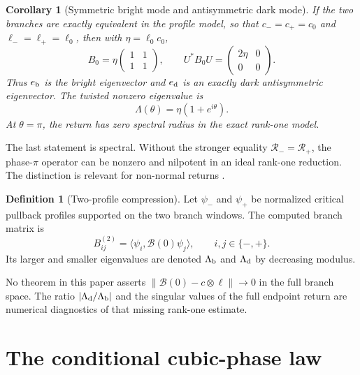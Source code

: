 \documentclass[11pt]{article}
\newtheorem{corollary}[theorem]{Corollary}
\theoremstyle{definition}
\newtheorem{definition}[theorem]{Definition}
\theoremstyle{remark}
\newcommand{\cR}{\mathcal R}
\newcommand{\cB}{\mathcal B}
\begin{document}
\begin{corollary}[Symmetric bright mode and antisymmetric dark mode]
\label{cor:bright-dark}
If the two branches are exactly equivalent in the profile model, so that
$c_-=c_+=c_0$ and $\ell_-=\ell_+=\ell_0$, then with
$\eta=\ell_0c_0$,
\begin{equation}\label{eq:symmetric-rank-one-matrix}
 B_0=\eta
 \begin{pmatrix}1&1\\1&1\end{pmatrix},
 \qquad
 U^*B_0U=
 \begin{pmatrix}2\eta&0\\0&0\end{pmatrix}.
\end{equation}
Thus $e_{\rm b}$ is the bright eigenvector and $e_{\rm d}$ is an exactly dark
antisymmetric eigenvector.  The twisted nonzero eigenvalue is
\begin{equation}\label{eq:symmetric-phase-eigenvalue}
 \Lambda(\theta)=\eta(1+e^{i\theta}).
\end{equation}
At $\theta=\pi$, the return has zero spectral radius in the exact rank-one
model.
\end{corollary}

The last statement is spectral.  Without the stronger equality
$\cR_-=\cR_+$, the phase-$\pi$ operator can be nonzero and nilpotent in an
ideal rank-one reduction.  The distinction is relevant for non-normal
returns \citep{TrefethenEmbree2005}.

\begin{definition}[Two-profile compression]
\label{def:compression}
Let $\psi_-$ and $\psi_+$ be normalized critical pullback profiles supported
on the two branch windows.  The computed branch matrix is
\begin{equation}\label{eq:galerkin-matrix}
 B^{(2)}_{ij}=\langle\psi_i,\cB(0)\psi_j\rangle,
 \qquad i,j\in\{-,+\}.
\end{equation}
Its larger and smaller eigenvalues are denoted $\Lambda_{\rm b}$ and
$\Lambda_{\rm d}$ by decreasing modulus.
\end{definition}

No theorem in this paper asserts
$\|\cB(0)-c\otimes\ell\|\to0$ in the full branch space.  The ratio
$|\Lambda_{\rm d}/\Lambda_{\rm b}|$ and the singular values of the full
endpoint return are numerical diagnostics of that missing rank-one estimate.

\section{The conditional cubic-phase law}
\label{sec:cubic-phase}
\end{document}

